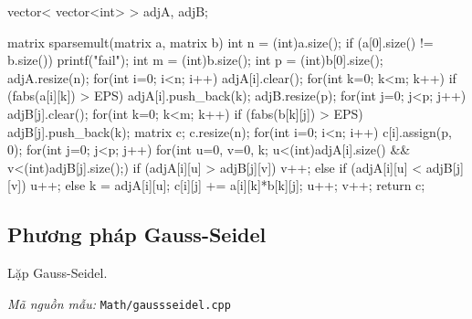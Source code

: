 \documentclass[11pt]{article}
\newcommand{\codepath}[1]{\par\noindent\textit{Mã nguồn mẫu:} \texttt{#1}\par}
\begin{document}
\begingroup\scriptsize
\begin{vncode}
vector< vector<int> > adjA, adjB;

matrix sparsemult(matrix a, matrix b) {
	int n = (int)a.size();
	if (a[0].size() != b.size()) printf("fail\n");
	int m = (int)b.size();
	int p = (int)b[0].size();
	adjA.resize(n);
	for(int i=0; i<n; i++) {
		adjA[i].clear();
		for(int k=0; k<m; k++) {
			if (fabs(a[i][k]) > EPS) adjA[i].push_back(k);
		}
	}
	adjB.resize(p);
	for(int j=0; j<p; j++) {
		adjB[j].clear();
		for(int k=0; k<m; k++) {
			if (fabs(b[k][j]) > EPS) adjB[j].push_back(k);
		}
	}
	matrix c;
	c.resize(n);
	for(int i=0; i<n; i++) {
		c[i].assign(p, 0);
		for(int j=0; j<p; j++) {
			for(int u=0, v=0, k; u<(int)adjA[i].size() && v<(int)adjB[j].size();) {
				if (adjA[i][u] > adjB[j][v]) v++;
				else if (adjA[i][u] < adjB[j][v]) u++;
				else {
					k = adjA[i][u];
					c[i][j] += a[i][k]*b[k][j];
					u++; v++;
				}
			}
		}
	}
	return c;
}
\end{vncode}
\endgroup


\subsection{Phương pháp Gauss-Seidel}

Lặp Gauss-Seidel.

\codepath{Math/gaussseidel.cpp}
\end{document}
